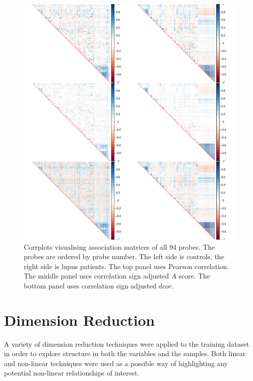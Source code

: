 \documentclass[a4paper, 12pt]{report}
\begin{document}
\begin{figure}[H]
\begin{centering}
\includegraphics[width=\textwidth]{corrplot3.pdf}
\caption{Corrplots visualising association matrices of all 94 probes. The probes are ordered by probe number. The left side is controls, the right side is lupus patients. The top panel uses Pearson correlation. The middle panel uses correlation sign adjusted $A$ score. The bottom panel uses correlation sign adjusted $dcor$.} 
 \label{F:Corr}
\end{centering}
\end{figure}

\section{Dimension Reduction}
A variety of dimension reduction techniques were applied to the training dataset in order to explore structure in both the variables and the samples. Both linear and non-linear techniques were used as a possible way of highlighting any potential non-linear relationships of interest.
\end{document}
